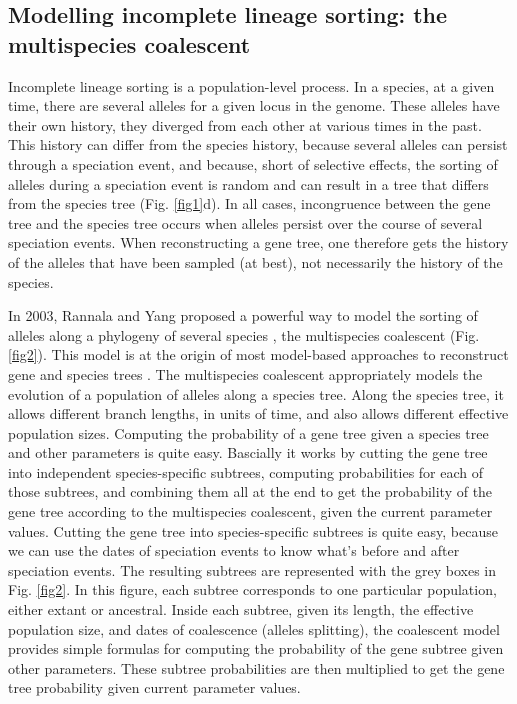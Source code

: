 \documentclass[11pt]{article}
\begin{document}
\subsection{Modelling incomplete lineage sorting: the multispecies coalescent}
Incomplete lineage sorting is a population-level process.
In a species, at a given time, there are several alleles for a given locus in the genome.
These alleles have their own history, they diverged from each other at various times in the past.
This history can differ from the species history, because several alleles can persist through a speciation event, and because, short of selective effects, the sorting of alleles during a speciation event is random and can result in a tree that differs from the species tree (Fig. \ref{fig1}d).
In all cases, incongruence between the gene tree and the species tree occurs when alleles persist over the course of several speciation events.
When reconstructing a gene tree, one therefore gets the history of the alleles that have been sampled (at best), not necessarily the history of the species. 

In 2003, Rannala and Yang proposed a powerful way to model the sorting of alleles along a phylogeny of several species \citep{Rannala2003a}, the multispecies coalescent (Fig. \ref{fig2}).
This model is at the origin of most model-based approaches to reconstruct gene and species trees \citep{Edwards2007,Heled2010}.
The multispecies coalescent appropriately models the evolution of a population of alleles along a species tree.
Along the species tree, it allows different branch lengths, in units of time, and also allows different effective population sizes.
Computing the probability of a gene tree given a species tree and other parameters is quite easy.
Bascially it works by cutting the gene tree into independent species-specific subtrees, computing probabilities for each of those subtrees, and combining them all at the end to get the probability of the gene tree according to the multispecies coalescent, given the current parameter values.
Cutting the gene tree into species-specific subtrees is quite easy, because we can use the dates of speciation events to know what's before and after speciation events. 
The resulting subtrees are represented with the grey boxes in Fig. \ref{fig2}.
In this figure, each subtree corresponds to one particular population, either extant or ancestral.
Inside each subtree, given its length, the effective population size, and dates of coalescence (alleles splitting), the coalescent model provides simple formulas for computing the probability of the gene subtree given other parameters.
These subtree probabilities are then multiplied to get the gene tree probability given current parameter values.
 
\end{document}
